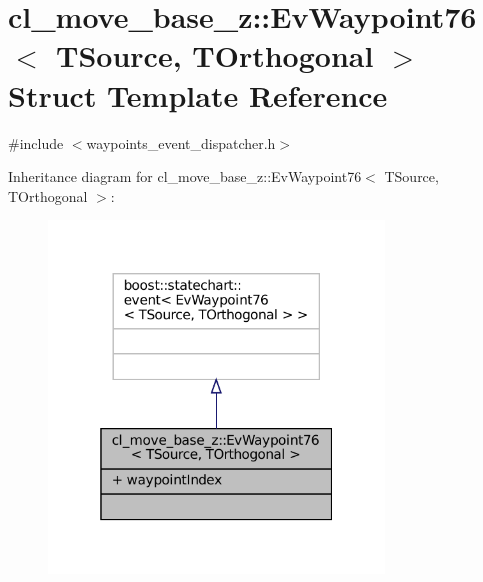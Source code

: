 \hypertarget{structcl__move__base__z_1_1EvWaypoint76}{}\section{cl\+\_\+move\+\_\+base\+\_\+z\+:\+:Ev\+Waypoint76$<$ T\+Source, T\+Orthogonal $>$ Struct Template Reference}
\label{structcl__move__base__z_1_1EvWaypoint76}


{\ttfamily \#include $<$waypoints\+\_\+event\+\_\+dispatcher.\+h$>$}



Inheritance diagram for cl\+\_\+move\+\_\+base\+\_\+z\+:\+:Ev\+Waypoint76$<$ T\+Source, T\+Orthogonal $>$\+:
\nopagebreak
\begin{figure}[H]
\begin{center}
\leavevmode
\includegraphics[width=253pt]{structcl__move__base__z_1_1EvWaypoint76__inherit__graph}
\end{center}
\end{figure}


